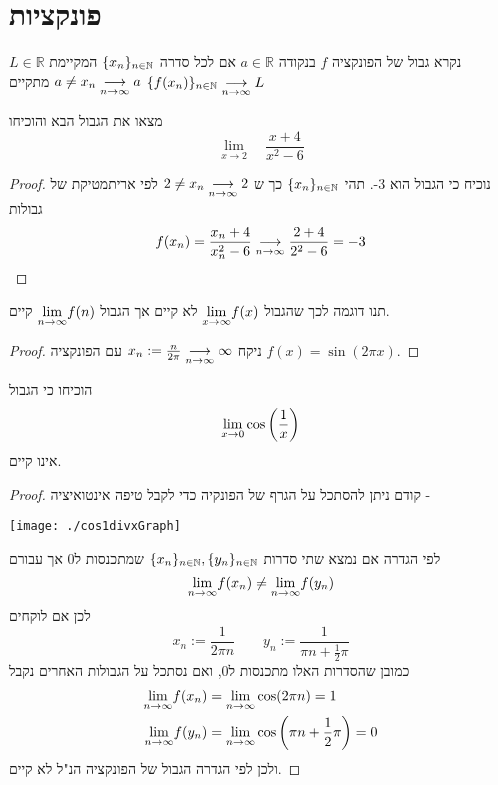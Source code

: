 \documentclass{article}
\begin{document}
\section{פונקציות}
\begin{definition}[גבול]
$L\in\mathbb{R}$
נקרא גבול של הפונקציה 
$f$
בנקודה 
$a\in\mathbb{R}$
אם לכל סדרה 
$\{x_n\}_{n\in\mathbb{N}}$ 
המקיימת 
$a\neq x_n\underset{n\rightarrow\infty}{\longrightarrow} a$
מתקיים 
$\{f(x_n)\}_{n\in\mathbb{N}}\underset{n\rightarrow\infty}{\longrightarrow} L$
\end{definition}

\begin{exercise}
מצאו את הגבול הבא והוכיחו
\[\underset{x\rightarrow 2}{\lim} \quad\frac{x+4}{x^2-6}\]
\end{exercise}

\begin{proof}
נוכיח כי הגבול הוא 3-. תהי 
$\{x_n\}_{n\in\mathbb{N}}$
כך ש 
$2 \neq x_n\underset{n\rightarrow\infty}{\longrightarrow} 2$
לפי אריתמטיקת של גבולות 
\[f(x_n) = \frac{x_n+4}{x_n^2-6}\underset{n\rightarrow\infty}{\longrightarrow} \frac{2+4}{2^2-6} = -3\]
\end{proof}

\begin{exercise}
תנו דוגמה לכך שהגבול 
$\underset{x\rightarrow\infty}{\lim} f(x)$
לא קיים אך הגבול 
$\underset{n\rightarrow\infty}{\lim} f(n)$
קיים.
\end{exercise}

\begin{proof}
ניקח 
$x_n:=\frac{n}{2\pi}\underset{n\rightarrow\infty}{\longrightarrow}\infty$
עם הפונקציה 
$f(x)=\sin(2\pi x)$.

\end{proof}

\begin{comment}
ההפך כמובן לא ייתכן לפי הגדרת הגבול של פונקציה.
\end{comment}

\begin{exercise}
הוכיחו כי הגבול 
\[\underset{x\rightarrow0}{\lim} \cos\left(\frac{1}{x}\right)\]
אינו קיים.
\end{exercise}

\begin{proof}

קודם ניתן להסתכל על הגרף של הפונקיה כדי לקבל טיפה אינטואיציה - 
\begin{center}
\texttt{[image: ./cos1divxGraph]}
\end{center}

לפי הגדרה אם נמצא שתי סדרות 
$\{x_n\}_{n\in\mathbb{N}}, \{y_n\}_{n\in\mathbb{N}}$
שמתכנסות ל0 אך עבורם 
\[\underset{n\rightarrow\infty}{\lim} f(x_n)\neq \underset{n\rightarrow\infty}{\lim} f(y_n)\]
לכן אם לוקחים 
\[x_n:=\frac{1}{2\pi n}\quad\quad y_n:=\frac{1}{\pi n +\frac{1}{2}\pi}\]
כמובן שהסדרות האלו מתכנסות ל0, ואם נסתכל על הגבולות האחרים נקבל
\begin{align*}
\underset{n\rightarrow\infty}{\lim} f(x_n)&=\underset{n\rightarrow\infty}{\lim}\cos(2\pi n) = 1\\
\underset{n\rightarrow\infty}{\lim} f(y_n)&=\underset{n\rightarrow\infty}{\lim} \cos\left(\pi n+\frac{1}{2}\pi\right) = 0
\end{align*}
ולכן לפי הגדרה הגבול של הפונקציה הנ"ל לא קיים.
\end{proof}
\end{document}
